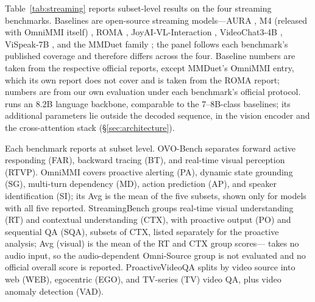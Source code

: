 Table~\ref{tab:streaming} reports subset-level results on the four
streaming benchmarks. Baselines are open-source streaming
models---AURA \citep{Lu2026aura}, M4 (released with OmniMMI itself)
\citep{Wang2025omnimmi}, ROMA \citep{Tian2026roma},
JoyAI-VL-Interaction \citep{Yao2026joyai}, VideoChat3-4B
\citep{Li2026videochat3}, ViSpeak-7B \citep{Fu2025vispeak}, and the
MMDuet family
\citep{Wang2024videollm,Wang2025proactivevideoqa,Wang2025mmduet2}; the
panel follows each benchmark's published coverage and therefore differs
across the four. Baseline numbers are taken from the respective
official reports, except MMDuet's OmniMMI entry, which its own report
does not cover and is taken from the ROMA report; \mossrealtime{}
numbers are from our own evaluation under each benchmark's official
protocol. %
\mossrealtime{} runs an 8.2B language backbone, comparable to
the 7--8B-class baselines; its additional parameters lie outside the
decoded sequence, in the vision encoder and the cross-attention stack
(\S\ref{sec:architecture}).

\begin{table}[!t]
  \centering
  \caption{Streaming benchmark results: \mossrealtime{} against
  open-source streaming baselines at subset level. Bold = best,
  underline = second best; ``--'' = subset not reported in that
  model's official report. Subset abbreviations, each benchmark's Avg
  convention, and data provenance are spelled out in
  \S\ref{sec:eval-streaming}.}
  \label{tab:streaming}
  
\end{table}

Each benchmark reports at subset level. OVO-Bench separates forward
active responding (FAR), backward tracing (BT), and real-time visual
perception (RTVP). OmniMMI covers proactive alerting (PA), dynamic
state grounding (SG), multi-turn dependency (MD), action prediction
(AP), and speaker identification (SI); its Avg is the mean of the five
subsets, shown only for models with all five reported. StreamingBench
groups real-time visual understanding (RT) and contextual
understanding (CTX), with proactive output (PO) and sequential QA
(SQA), subsets of CTX, listed separately for the proactive analysis;
Avg (visual) is the mean of the RT and CTX group scores---\mossvl{}
takes no audio input, so the audio-dependent Omni-Source group is not
evaluated and no official overall score is reported. ProactiveVideoQA
splits by video source into web (WEB), egocentric (EGO), and TV-series
(TV) video QA, plus video anomaly detection (VAD).

